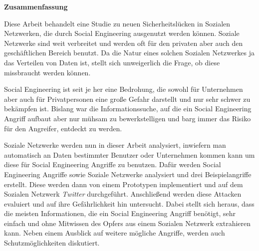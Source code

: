 
\clearemptydoublepage
{}
{}


\vspace*{2cm}
\begin{center}
{\Large \bf Zusammenfassung}
\end{center}
\vspace{1cm}

Diese Arbeit behandelt eine Studie zu neuen Sicherheitslücken in Sozialen
Netzwerken, die durch Social Engineering ausgenutzt werden können. Soziale
Netzwerke sind weit verbreitet und werden oft für den privaten aber auch den
geschäftlichen Bereich benutzt. Da die Natur eines solchen Sozialen Netzwerkes
ja das Verteilen von Daten ist, stellt sich unweigerlich die Frage, ob diese
missbraucht werden können.

Social Engineering ist seit je her eine Bedrohung, die sowohl für Unternehmen
aber auch für Privatpersonen eine große Gefahr darstellt und nur sehr schwer zu
bekämpfen ist. Bislang war die Informationssuche, auf die ein Social
Engineering Angriff aufbaut aber nur mühsam zu bewerkstelligen und barg immer
das Risiko für den Angreifer, entdeckt zu werden.

Soziale Netzwerke werden nun in dieser Arbeit analysiert, inwiefern man
automatisch an Daten bestimmter Benutzer oder Unternehmen kommen kann um diese für
Social Engineering Angriffe zu benutzen. Dafür werden Social Engineering
Angriffe sowie Soziale Netzwerke analysiert und drei Beispielangriffe erstellt.
Diese werden dann von einem Prototypen implementiert und auf dem Sozialen
Netzwerk \textit{Twitter} durchgeführt. Anschließend werden diese Attacken
evaluiert und auf ihre Gefährlichkeit hin untersucht. Dabei stellt sich heraus,
dass die meisten Informationen, die ein Social Engineering Angriff benötigt,
sehr einfach und ohne Mitwissen des Opfers aus einem Sozialen Netzwerk
extrahieren kann. Neben einem Ausblick auf weitere mögliche Angriffe, werden
auch Schutzmöglichkeiten diskutiert.

